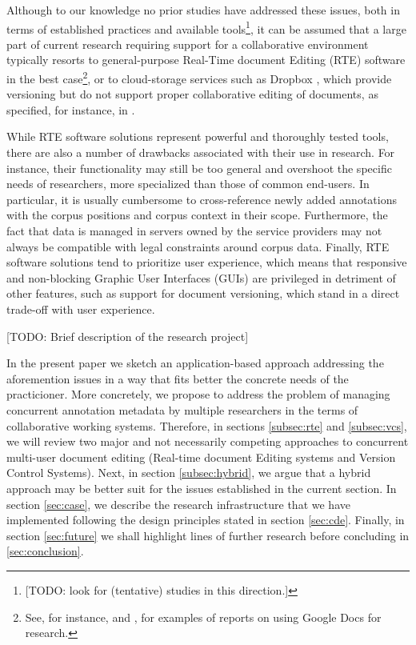 \documentclass{sig-alternate}
\begin{document}
Although to our knowledge no prior studies have addressed these issues, both in terms of
established practices and available tools\footnote{
  [TODO: look for (tentative) studies in this direction.]
}, it can be assumed that a large part of current research requiring support for a
collaborative environment typically resorts to general-purpose Real-Time document Editing
(RTE) software in the best case\footnote{
  See, for instance, \cite{Rowlands2011} and \cite{Wood2011}, for examples of reports on
  using Google Docs for research.
}, or to cloud-storage services \textemdash such as Dropbox \cite{Dropboxa} \textemdash,
which provide versioning but do not support proper collaborative editing of documents,
as specified, for instance, in \cite{Dropbox}.

While RTE software solutions represent powerful and thoroughly tested tools, there are also
a number of drawbacks associated with their use in research.
For instance, their functionality may still be too general and overshoot the specific needs of
researchers, more specialized than those of common end-users. In particular, it is usually
cumbersome to cross-reference newly added annotations with the corpus positions and corpus
context in their scope.
Furthermore, the fact that data is managed in servers owned by the service providers may not
always be compatible with legal constraints around corpus data.
Finally, RTE software solutions tend to prioritize user experience, which means that
responsive and non-blocking Graphic User Interfaces (GUIs) are privileged in detriment of
other features, such as support for document versioning, which stand in a direct trade-off
with user experience.

[TODO: Brief description of the research project]

In the present paper we sketch an application-based approach addressing the aforemention
issues in a way that fits better the concrete needs of the practicioner.
More concretely, we propose to address the problem of managing concurrent annotation
metadata by multiple researchers in the terms of collaborative working systems.
Therefore, in sections \ref{subsec:rte} and \ref{subsec:vcs}, we will review two major and
not necessarily competing approaches to concurrent multi-user document editing
(Real-time document Editing systems and Version Control Systems).
Next, in section \ref{subsec:hybrid}, we argue that a hybrid approach may be better suit for
the issues established in the current section.
In section \ref{sec:case}, we describe the research infrastructure that we have implemented
following the design principles stated in section \ref{sec:cde}.
Finally, in section \ref{sec:future} we shall highlight lines of further research before
concluding in \ref{sec:conclusion}.
\end{document}
